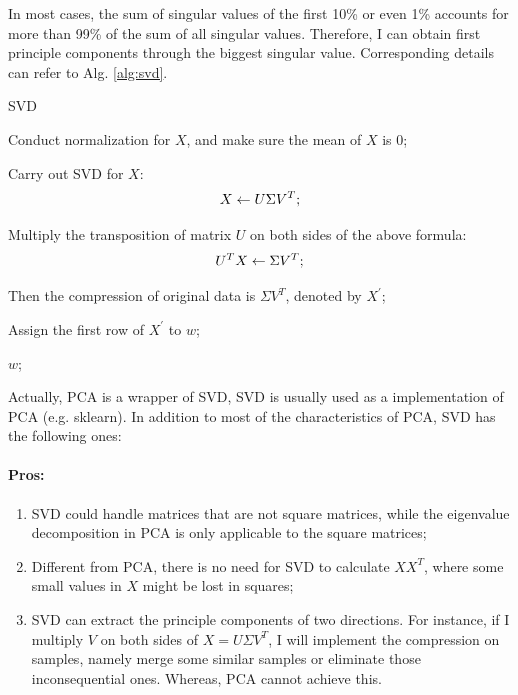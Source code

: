 \documentclass[12pt,a4paper]{article}
\theoremstyle{definition}
\begin{document}
In most cases, the sum of singular values of the first 10\% or even 1\% accounts for more than 99\% of the sum of all singular values. Therefore, I can obtain first principle components through the biggest singular value. Corresponding details can refer to Alg. \ref{alg:svd}.

\vspace{0.01\linewidth}
\begin{algorithm}[H]
	\caption{SVD}
	\label{alg:svd}
	\vspace{0.25\baselineskip}
	
	
	Conduct normalization for $X$, and make sure the mean of $X$ is 0;
	
	Carry out SVD for $X$:
	\begin{equation*}
		\centering
		X \leftarrow U \Sigma V^T;
	\end{equation*}
	
	Multiply the transposition of matrix $U$ on both sides of the above formula:
	\begin{equation*}
		\centering
		U^TX \leftarrow \Sigma V^T;
	\end{equation*}
	
	Then the compression of original data is $\Sigma V^T$, denoted by $X^{'}$;
	
	Assign the first row of $X^{'}$ to $w$;
	
	\Return $w$;
\end{algorithm}
\vspace{0.01\linewidth}

Actually, PCA is a wrapper of SVD, SVD is usually used as a implementation of PCA (e.g. sklearn). In addition to most of the characteristics of PCA, SVD has the following ones:

\vspace{-0.012\linewidth}
\paragraph{Pros:}
\begin{enumerate}
	\item SVD could handle matrices that are not square matrices, while the eigenvalue decomposition in PCA is only applicable to the square matrices;
	
	\item Different from PCA, there is no need for SVD to calculate $XX^T$, where some small values in $X$ might be lost in squares;
	
	\item SVD can extract the principle components of two directions. For instance, if I multiply $V$ on both sides of $X=U \Sigma V^T$, I will implement the compression on samples, namely merge some similar samples or eliminate those inconsequential ones. Whereas, PCA cannot achieve this.
\end{enumerate}
\end{document}
